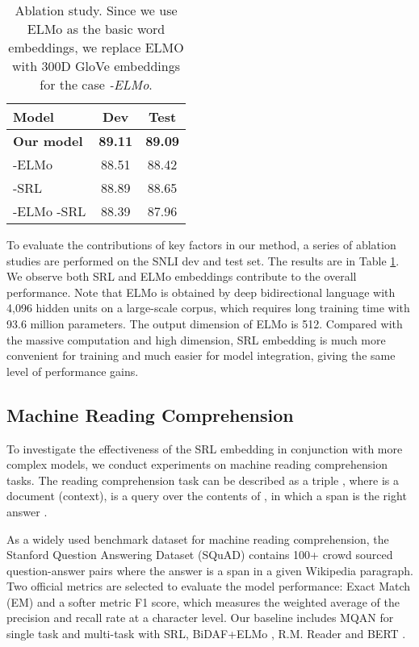 \documentclass[11pt]{article}
\begin{document}
\begin{table}
	\centering
	{
		\begin{tabular}{l c c}
			\hline
			
			\hline
			Model& Dev & Test\\
			\hline
			\textbf{Our model} &\textbf{89.11} & \textbf{89.09} \\
			\hline
			-ELMo & 88.51   & 88.42 \\
			-SRL &  88.89   &  88.65 \\	
			-ELMo -SRL &  88.39  & 87.96 \\
			\hline
			
			\hline
		\end{tabular}
	}
	
	\caption{\label{tab:ablation} Ablation study. Since we use ELMo as the basic word embeddings, we replace ELMO with 300D GloVe embeddings for the case \emph{-ELMo}.}
\end{table}
To evaluate the contributions of key factors in our
method, a series of ablation studies are performed
on the SNLI dev and test set. The results are in Table \ref{tab:ablation}. We observe both SRL and ELMo embeddings contribute to the overall performance. Note that ELMo is obtained by deep bidirectional language with 4,096 hidden units on a large-scale corpus, which requires long training time with 93.6 million parameters. The output dimension of ELMo is 512. Compared with the massive computation and high dimension, SRL embedding is much more convenient for training and much easier for model integration, giving the same level of performance gains.

\subsection{Machine Reading Comprehension} 

To investigate the effectiveness of the SRL embedding in conjunction with more complex models, we conduct experiments on machine reading comprehension tasks. The reading comprehension task can be described as a triple , where  is a document (context),  is a query over the contents of , in which a span is the right answer .  

As a widely used benchmark dataset for machine reading comprehension, the Stanford Question Answering Dataset (SQuAD) \citep{Rajpurkar2016SQuAD} contains 100+ crowd sourced question-answer pairs where the answer is a span in a given Wikipedia paragraph. Two official metrics are selected to evaluate the model performance: Exact Match (EM) and a softer metric F1 score, which measures the weighted average of the precision and recall rate at a character level. Our baseline includes MQAN \citep{Mccann2018The} for single task and multi-task with SRL, BiDAF+ELMo \citep{Peters2018ELMO}, R.M. Reader and BERT \citep{devlin2018bert}.
\end{document}
